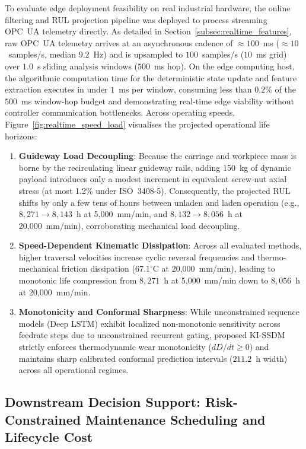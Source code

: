 \documentclass[a4paper,fleqn]{cas-dc}
\begin{document}
To evaluate edge deployment feasibility on real industrial hardware, the online filtering and RUL projection pipeline was deployed to process streaming OPC~UA telemetry directly. As detailed in Section~\ref{subsec:realtime_features}, raw OPC~UA telemetry arrives at an asynchronous cadence of $\approx 100$~ms ($\approx 10$~samples/s, median $9.2$~Hz) and is upsampled to $100$~samples/s ($10$~ms grid) over $1.0$~s sliding analysis windows ($500$~ms hop). On the edge computing host, the algorithmic computation time for the deterministic state update and feature extraction executes in under $1$~ms per window, consuming less than $0.2\%$ of the $500$~ms window-hop budget and demonstrating real-time edge viability without controller communication bottlenecks. Across operating speeds, Figure~\ref{fig:realtime_speed_load} visualises the projected operational life horizons:
\begin{enumerate}[label=(\alph*),leftmargin=2.2em]
    \item \textbf{Guideway Load Decoupling}: Because the carriage and workpiece mass is borne by the recirculating linear guideway rails, adding 150~kg of dynamic payload introduces only a modest increment in equivalent screw-nut axial stress (at most 1.2\% under ISO~3408-5). Consequently, the projected RUL shifts by only a few tens of hours between unladen and laden operation (e.g., $8{,}271 \to 8{,}143$~h at 5,000~mm/min, and $8{,}132 \to 8{,}056$~h at 20,000~mm/min), corroborating mechanical load decoupling.
    \item \textbf{Speed-Dependent Kinematic Dissipation}: Across all evaluated methods, higher traversal velocities increase cyclic reversal frequencies and thermo-mechanical friction dissipation ($67.1^\circ\mathrm{C}$ at 20,000~mm/min), leading to monotonic life compression from $8{,}271$~h at 5,000~mm/min down to $8{,}056$~h at 20,000~mm/min.
    \item \textbf{Monotonicity and Conformal Sharpness}: While unconstrained sequence models (Deep LSTM) exhibit localized non-monotonic sensitivity across feedrate steps due to unconstrained recurrent gating, proposed KI-SSDM strictly enforces thermodynamic wear monotonicity ($dD/dt \ge 0$) and maintains sharp calibrated conformal prediction intervals ($211.2$~h width) across all operational regimes.
\end{enumerate}
\subsection{Downstream Decision Support: Risk-Constrained Maintenance Scheduling and Lifecycle Cost}
\label{subsec:decision_support}
\end{document}
